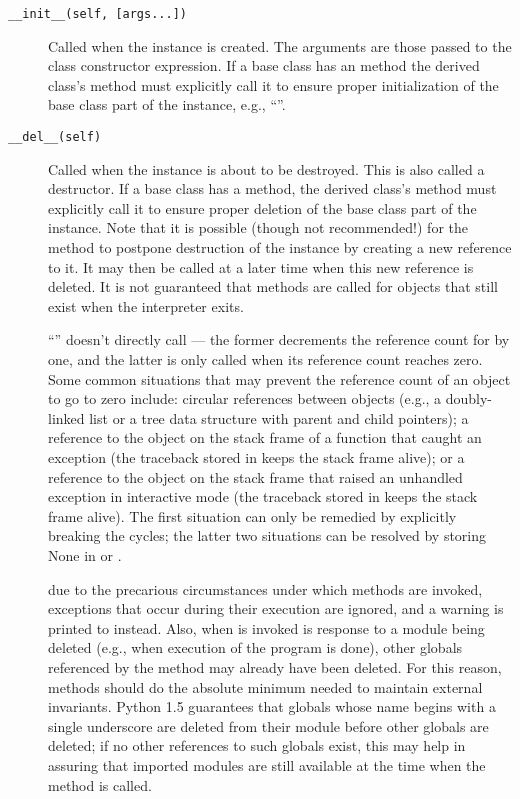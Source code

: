 \begin{description}

\item[{\tt __init__(self, [args...])}]
Called when the instance is created.  The arguments are those passed
to the class constructor expression.  If a base class has an
 method the derived class's  method must
explicitly call it to ensure proper initialization of the base class
part of the instance, e.g., ``''.


\item[{\tt __del__(self)}]
Called when the instance is about to be destroyed.  This is also
called a destructor.  If a base class
has a  method, the derived class's  method
must explicitly call it to ensure proper deletion of the base class
part of the instance.  Note that it is possible (though not recommended!)
for the 
method to postpone destruction of the instance by creating a new
reference to it.  It may then be called at a later time when this new
reference is deleted.  It is not guaranteed that
 methods are called for objects that still exist when
the interpreter exits.

 ``'' doesn't directly call
 --- the former decrements the reference count for
 by one, and the latter is only called when its reference
count reaches zero.  Some common situations that may prevent the
reference count of an object to go to zero include: circular
references between objects (e.g., a doubly-linked list or a tree data
structure with parent and child pointers); a reference to the object
on the stack frame of a function that caught an exception (the
traceback stored in  keeps the stack frame
alive); or a reference to the object on the stack frame that raised an
unhandled exception in interactive mode (the traceback stored in
 keeps the stack frame alive).  The first
situation can only be remedied by explicitly breaking the cycles; the
latter two situations can be resolved by storing None in
 or .

 due to the precarious circumstances under which
 methods are invoked, exceptions that occur during their
execution are ignored, and a warning is printed to 
instead.  Also, when  is invoked is response to a module
being deleted (e.g., when execution of the program is done), other
globals referenced by the  method may already have been
deleted.  For this reason,  methods should do the
absolute minimum needed to maintain external invariants.  Python 1.5
guarantees that globals whose name begins with a single underscore are
deleted from their module before other globals are deleted; if no
other references to such globals exist, this may help in assuring that
imported modules are still available at the time when the
 method is called. 


\end{description}
